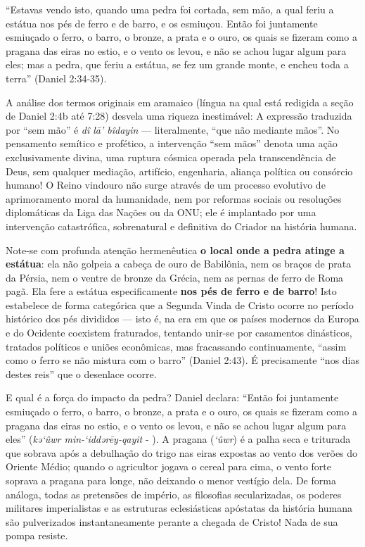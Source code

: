 ``Estavas vendo isto, quando uma pedra foi cortada, sem mão, a qual feriu a estátua nos pés de ferro e de barro, e os esmiuçou. Então foi juntamente esmiuçado o ferro, o barro, o bronze, a prata e o ouro, os quais se fizeram como a pragana das eiras no estio, e o vento os levou, e não se achou lugar algum para eles; mas a pedra, que feriu a estátua, se fez um grande monte, e encheu toda a terra'' (Daniel 2:34-35).

A análise dos termos originais em aramaico (língua na qual está redigida a seção de Daniel 2:4b até 7:28) desvela uma riqueza inestimável:
A expressão traduzida por ``sem mão'' é \textit{dî lā’ bîdayin} — literalmente, ``que não mediante mãos''. No pensamento semítico e profético, a intervenção ``sem mãos'' denota uma ação exclusivamente divina, uma ruptura cósmica operada pela transcendência de Deus, sem qualquer mediação, artifício, engenharia, aliança política ou consórcio humano! O Reino vindouro não surge através de um processo evolutivo de aprimoramento moral da humanidade, nem por reformas sociais ou resoluções diplomáticas da Liga das Nações ou da ONU; ele é implantado por uma intervenção catastrófica, sobrenatural e definitiva do Criador na história humana.

Note-se com profunda atenção hermenêutica \textbf{o local onde a pedra atinge a estátua}: ela não golpeia a cabeça de ouro de Babilônia, nem os braços de prata da Pérsia, nem o ventre de bronze da Grécia, nem as pernas de ferro de Roma pagã. Ela fere a estátua especificamente \textbf{nos pés de ferro e de barro}! Isto estabelece de forma categórica que a Segunda Vinda de Cristo ocorre no período histórico dos pés divididos — isto é, na era em que os países modernos da Europa e do Ocidente coexistem fraturados, tentando unir-se por casamentos dinásticos, tratados políticos e uniões econômicas, mas fracassando continuamente, ``assim como o ferro se não mistura com o barro'' (Daniel 2:43). É precisamente ``nos dias destes reis'' que o desenlace ocorre.

E qual é a força do impacto da pedra? Daniel declara:
``Então foi juntamente esmiuçado o ferro, o barro, o bronze, a prata e o ouro, os quais se fizeram como a pragana das eiras no estio, e o vento os levou, e não se achou lugar algum para eles'' (\textit{kə‘ûwr min-‘iddərēy-qayit} - ).
A pragana (\textit{‘ûwr}) é a palha seca e triturada que sobrava após a debulhação do trigo nas eiras expostas ao vento dos verões do Oriente Médio; quando o agricultor jogava o cereal para cima, o vento forte soprava a pragana para longe, não deixando o menor vestígio dela. De forma análoga, todas as pretensões de império, as filosofias secularizadas, os poderes militares imperialistas e as estruturas eclesiásticas apóstatas da história humana são pulverizados instantaneamente perante a chegada de Cristo! Nada de sua pompa resiste.

